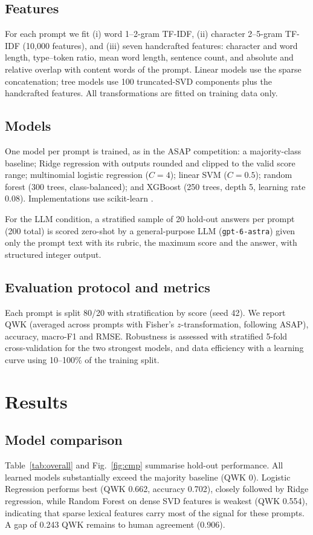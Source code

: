 \documentclass[conference]{IEEEtran}
\begin{document}
\subsection{Features}
For each prompt we fit (i) word 1--2-gram TF-IDF, (ii) character 2--5-gram TF-IDF (10,000 features), and (iii) seven handcrafted features: character and word length, type--token ratio, mean word length, sentence count, and absolute and relative overlap with content words of the prompt. Linear models use the sparse concatenation; tree models use 100 truncated-SVD components plus the handcrafted features. All transformations are fitted on training data only.

\subsection{Models}
One model per prompt is trained, as in the ASAP competition: a majority-class baseline; Ridge regression with outputs rounded and clipped to the valid score range; multinomial logistic regression ($C=4$); linear SVM ($C=0.5$); random forest (300 trees, class-balanced); and XGBoost \cite{chen2016} (250 trees, depth 5, learning rate 0.08). Implementations use scikit-learn \cite{pedregosa2011}.

For the LLM condition, a stratified sample of 20 hold-out answers per prompt (200 total) is scored zero-shot by a general-purpose LLM (\texttt{gpt-6-astra}) given only the prompt text with its rubric, the maximum score and the answer, with structured integer output.

\subsection{Evaluation protocol and metrics}
Each prompt is split 80/20 with stratification by score (seed 42). We report QWK (averaged across prompts with Fisher's $z$-transformation, following ASAP), accuracy, macro-F1 and RMSE. Robustness is assessed with stratified 5-fold cross-validation for the two strongest models, and data efficiency with a learning curve using 10--100\% of the training split.

\section{Results}
\subsection{Model comparison}
Table~\ref{tab:overall} and Fig.~\ref{fig:cmp} summarise hold-out performance. All learned models substantially exceed the majority baseline (QWK 0). Logistic Regression performs best (QWK 0.662, accuracy 0.702), closely followed by Ridge regression, while Random Forest on dense SVD features is weakest (QWK 0.554), indicating that sparse lexical features carry most of the signal for these prompts. A gap of 0.243 QWK remains to human agreement (0.906).
\end{document}
